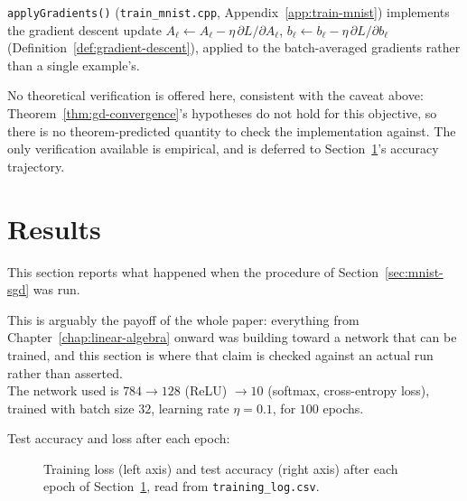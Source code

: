 	\begin{compremark}
		\texttt{applyGradients()} (\texttt{train\_mnist.cpp}, Appendix~\ref{app:train-mnist}) implements the gradient descent update $A_\ell \leftarrow A_\ell - \eta\,\partial L/\partial A_\ell$, $b_\ell \leftarrow b_\ell - \eta\,\partial L/\partial b_\ell$ (Definition~\ref{def:gradient-descent}), applied to the batch-averaged gradients rather than a single example's.
		
		No theoretical verification is offered here, consistent with the caveat above: Theorem~\ref{thm:gd-convergence}'s hypotheses do not hold for this objective, so there is no theorem-predicted quantity to check the implementation against. The only verification available is empirical, and is deferred to Section~\ref{sec:mnist-results}'s accuracy trajectory.
	\end{compremark}

\section{Results}
\label{sec:mnist-results}
	
	This section reports what happened when the procedure of Section~\ref{sec:mnist-sgd} was run.
	
	This is arguably the payoff of the whole paper: everything from Chapter~\ref{chap:linear-algebra} onward was building toward a network that can be trained, and this section is where that claim is checked against an actual run rather than asserted. \\
	
	The network used is $784 \to 128$ (ReLU) $\to 10$ (softmax, cross-entropy loss), trained with batch size $32$, learning rate $\eta=0.1$, for $100$ epochs.
	
	Test accuracy and loss after each epoch:
	
	\begin{figure}[htbp]
		\centering
		\caption{Training loss (left axis) and test accuracy (right axis) after each epoch of Section~\ref{sec:mnist-results}, read from \texttt{training\_log.csv}.}
		\label{fig:accuracy-and-loss}
	\end{figure}
	

